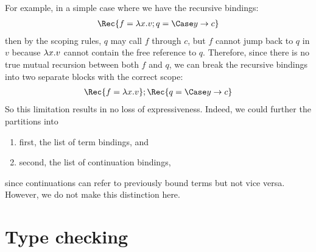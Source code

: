 \documentclass{article}
\begin{document}
For example, in a simple case where we have the recursive bindings:
\begin{gather*}
  \Rec \{ \bind{f}{\fn x v}; \bind{q}{\Case\alt{y}{c}} \}
\end{gather*}
then by the scoping rules, $q$ may call $f$ through $c$, but $f$ cannot jump
back to $q$ in $v$ because $\lambda{x}. v$ cannot contain the free reference to $q$.
Therefore, since there is no true mutual recursion between both $f$ and $q$, we
can break the recursive bindings into two separate blocks with the correct
scope:
\begin{gather*}
  \Rec \{ \bind{f}{\fn x v} \}; \Rec \{ \bind{q}{\Case\alt{y}{c}} \}
\end{gather*}
So this limitation results in no loss of expressiveness.  Indeed, we could
further the partitions into
\begin{enumerate}
\item first, the list of term bindings, and
\item second, the list of continuation bindings,
\end{enumerate}
since continuations can refer to previously bound terms but not vice versa.
However, we do not make this distinction here.

\section{Type checking}
\label{sec:typing}
\end{document}
